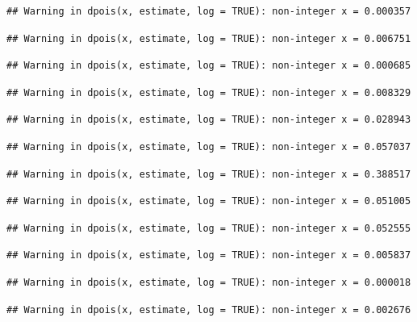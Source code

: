 \documentclass[]{article}
\begin{document}
\begin{verbatim}
## Warning in dpois(x, estimate, log = TRUE): non-integer x = 0.000357
\end{verbatim}

\begin{verbatim}
## Warning in dpois(x, estimate, log = TRUE): non-integer x = 0.006751
\end{verbatim}

\begin{verbatim}
## Warning in dpois(x, estimate, log = TRUE): non-integer x = 0.000685
\end{verbatim}

\begin{verbatim}
## Warning in dpois(x, estimate, log = TRUE): non-integer x = 0.008329
\end{verbatim}

\begin{verbatim}
## Warning in dpois(x, estimate, log = TRUE): non-integer x = 0.028943
\end{verbatim}

\begin{verbatim}
## Warning in dpois(x, estimate, log = TRUE): non-integer x = 0.057037
\end{verbatim}

\begin{verbatim}
## Warning in dpois(x, estimate, log = TRUE): non-integer x = 0.388517
\end{verbatim}

\begin{verbatim}
## Warning in dpois(x, estimate, log = TRUE): non-integer x = 0.051005
\end{verbatim}

\begin{verbatim}
## Warning in dpois(x, estimate, log = TRUE): non-integer x = 0.052555
\end{verbatim}

\begin{verbatim}
## Warning in dpois(x, estimate, log = TRUE): non-integer x = 0.005837
\end{verbatim}

\begin{verbatim}
## Warning in dpois(x, estimate, log = TRUE): non-integer x = 0.000018
\end{verbatim}

\begin{verbatim}
## Warning in dpois(x, estimate, log = TRUE): non-integer x = 0.002676
\end{verbatim}
\end{document}
